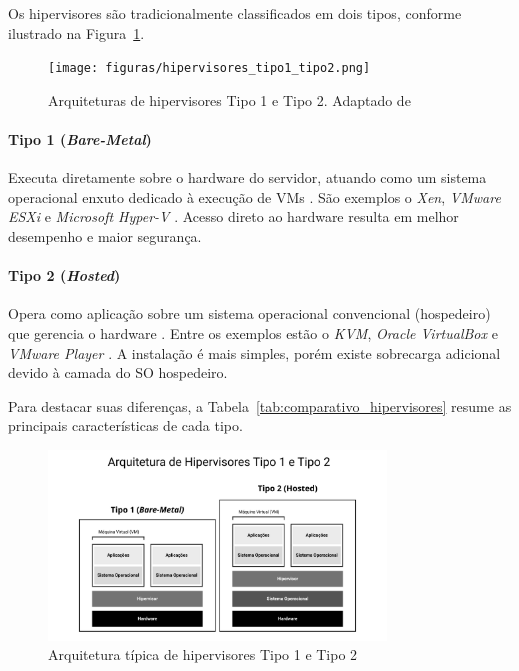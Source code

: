 Os hipervisores são tradicionalmente classificados em dois tipos, conforme ilustrado na Figura~\ref{fig:arq-hipervisores}.

\begin{figure}[htb]
    \centering
    \texttt{[image: figuras/hipervisores\_tipo1\_tipo2.png]}
    \caption{Arquiteturas de hipervisores Tipo 1 e Tipo 2. Adaptado de \cite{chawla2025, kominos2017}}
    \label{fig:arq-hipervisores}
\end{figure}

\paragraph{Tipo 1 (\textit{Bare-Metal})} Executa diretamente sobre o hardware do servidor, atuando como um sistema operacional enxuto dedicado à execução de VMs \cite{chawla2025}. São exemplos o \textit{Xen}, \textit{VMware ESXi} e \textit{Microsoft Hyper-V} \cite{chawla2025, carissimi2008}. Acesso direto ao hardware resulta em melhor desempenho e maior segurança.

\paragraph{Tipo 2 (\textit{Hosted})} Opera como aplicação sobre um sistema operacional convencional (hospedeiro) que gerencia o hardware \cite{chawla2025}. Entre os exemplos estão o \textit{KVM}, \textit{Oracle VirtualBox} e \textit{VMware Player} \cite{chawla2025, carissimi2008}. A instalação é mais simples, porém existe sobrecarga adicional devido à camada do SO hospedeiro.

Para destacar suas diferenças, a Tabela~\ref{tab:comparativo_hipervisores} resume as principais características de cada tipo.

\begin{figure}[htb]
    \centering
    \includegraphics[width=0.8\textwidth]{../figuras/Figura 2 - Arquitetura de Hipervisores.png}
    \caption{Arquitetura típica de hipervisores Tipo 1 e Tipo 2}
    \label{fig:arq_hipervisores}
\end{figure}

